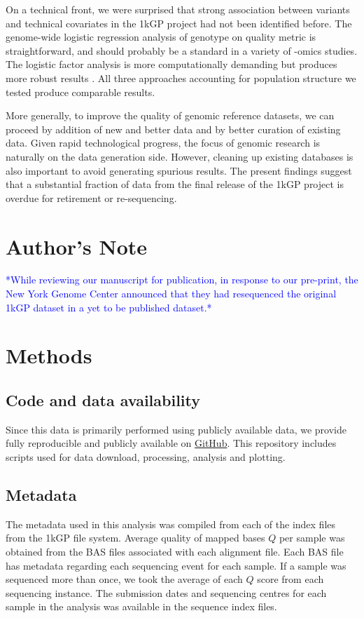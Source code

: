 \documentclass[9pt,lineno]{template}
\newcommand{\todo}[1]{\textcolor{blue}{*#1*}}
\begin{document}
On a technical front, we were surprised that strong association between variants and technical covariates in the 1kGP project had not been identified before. 
The genome-wide logistic regression analysis of genotype on quality metric is straightforward, and should probably be a standard in a variety of -omics studies. 
The logistic factor analysis is more computationally demanding but produces more robust results \citep{song2015testing}. 
All three approaches accounting for population structure we tested produce comparable results.  

More generally, to improve the quality of genomic reference datasets, we can proceed by addition of new and better data and by better curation of existing data.
Given rapid technological progress, the focus of genomic research is naturally on the data generation side. 
However, cleaning up existing databases is also important to avoid generating spurious results. 
The present findings suggest that a substantial fraction of data from the final release of the 1kGP project is overdue for retirement or re-sequencing.

\section{Author's Note}
\todo{While reviewing our manuscript for publication, in response to our pre-print, the New York Genome Center announced that they had resequenced the original 1kGP dataset in a yet to be published dataset.}

\section{Methods}
\subsection{Code and data availability}
Since this data is primarily performed using publicly available data, we provide fully reproducible and publicly available on \href{https://github.com/LukeAndersonTrocme/LegacyData}{GitHub}.
This repository includes scripts used for data download, processing, analysis and plotting.

\subsection{Metadata}
The metadata used in this analysis was compiled from each of the index files from the 1kGP file system. 
Average quality of mapped bases $Q$ per sample was obtained from the BAS files associated with each alignment file.
Each BAS file has metadata regarding each sequencing event for each sample. 
If a sample was sequenced more than once, we took the average of each $Q$ score from each sequencing instance. 
The submission dates and sequencing centres for each sample in the analysis was available in the sequence index files.
\end{document}
